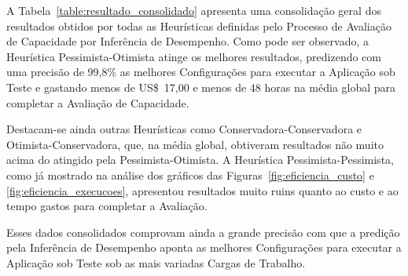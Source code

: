 A Tabela~\ref{table:resultado_consolidado} apresenta uma consolidação geral dos
resultados obtidos por todas as Heurísticas definidas pelo Processo de Avaliação
de Capacidade por Inferência de Desempenho. Como pode ser observado, a Heurística 
Pessimista-Otimista atinge os melhores resultados, predizendo com uma precisão de 
99,8\% as melhores Configurações para executar a Aplicação sob Teste e gastando 
menos de US\$~17,00 e menos de 48 horas na média global para completar a Avaliação 
de Capacidade.  

Destacam-se ainda outras Heurísticas como Conservadora-Conservadora e 
Otimista-Conservadora, que, na média global, obtiveram resultados não muito acima
do atingido pela Pessimista-Otimista. A Heurística Pessimista-Pessimista, como
já mostrado na análise dos gráficos das 
Figuras~\ref{fig:eficiencia_custo} e \ref{fig:eficiencia_execucoes}, apresentou
resultados muito ruins quanto ao custo e ao tempo gastos para completar a Avaliação.

Esses dados consolidados comprovam ainda a grande precisão com que a predição
pela Inferência de Desempenho aponta as melhores Configurações para executar a
Aplicação sob Teste sob as mais variadas Cargas de Trabalho.
 




